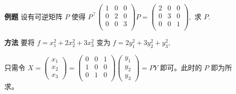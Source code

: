\begin{itemize}
    \item[\textbf{例题}] 设有可逆矩阵 $ P $ 使得 $ P^\top\begin{pmatrix}
        1&0&0\\0&2&0\\0&0&3\\
    \end{pmatrix} P = \begin{pmatrix}
        2&0&0\\0&3&0\\0&0&1\\
    \end{pmatrix}, $ 求 $ P. $ 
    \item[\textbf{方法}] 要将 $ f = x^2_1+2x^2_2+3x^2_3 $ 
    变为 $ f = 2y^2_1 + 3y^2_2+y^2_3, $ 

    只需令 $ X = \begin{pmatrix}
        x_1\\x_2\\x_3
    \end{pmatrix} = \begin{pmatrix}
        0&0&1\\1&0&0\\0&1&0\\
    \end{pmatrix}\begin{pmatrix}
        y_1\\y_2\\y_3
    \end{pmatrix} = PY $ 即可。此时的 $ P $ 即为所求。
\end{itemize}

